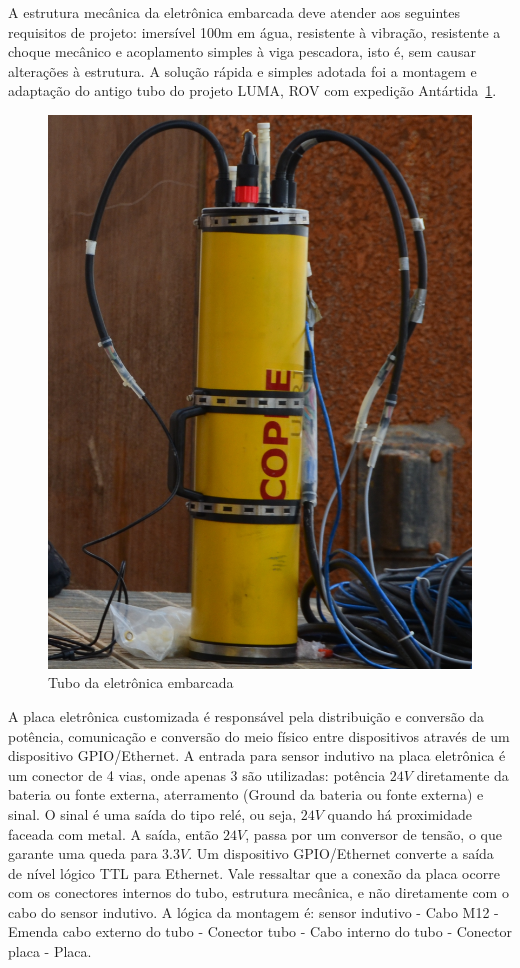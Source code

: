 A estrutura mecânica da eletrônica embarcada deve atender aos seguintes
requisitos de projeto: imersível 100m em água, resistente à vibração, resistente a choque
mecânico e acoplamento simples à viga pescadora, isto é, sem causar alterações à
estrutura. A solução rápida e simples adotada foi a montagem e adaptação do
antigo tubo do projeto LUMA, ROV com expedição Antártida~\ref{fig:tubo}. 

\begin{figure}[H]
 \centering
 \includegraphics[width=1\columnwidth]{indutivo/figs/tubo.jpg}
 \caption{Tubo da eletrônica embarcada}
 \label{fig:tubo}
 \end{figure}

A placa eletrônica customizada é responsável pela distribuição e conversão da
potência, comunicação e conversão do meio físico entre dispositivos através de
um dispositivo GPIO/Ethernet. A entrada para sensor indutivo na placa eletrônica
é um conector de 4 vias, onde apenas 3 são utilizadas: potência $24V$
diretamente da bateria ou fonte externa, aterramento (Ground da bateria ou fonte
externa) e sinal. O sinal é uma saída do tipo relé, ou seja, $24V$ quando há
proximidade faceada com metal. A saída, então $24V$, passa por um conversor de
tensão, o que garante uma queda para $3.3V$. Um dispositivo GPIO/Ethernet
converte a saída de nível lógico TTL para Ethernet. Vale ressaltar que a
conexão da placa ocorre com os conectores internos do tubo, estrutura mecânica,
e não diretamente com o cabo do sensor indutivo. A lógica da montagem é: sensor
indutivo - Cabo M12 - Emenda cabo externo do tubo - Conector tubo - Cabo interno do tubo - Conector placa - Placa.

